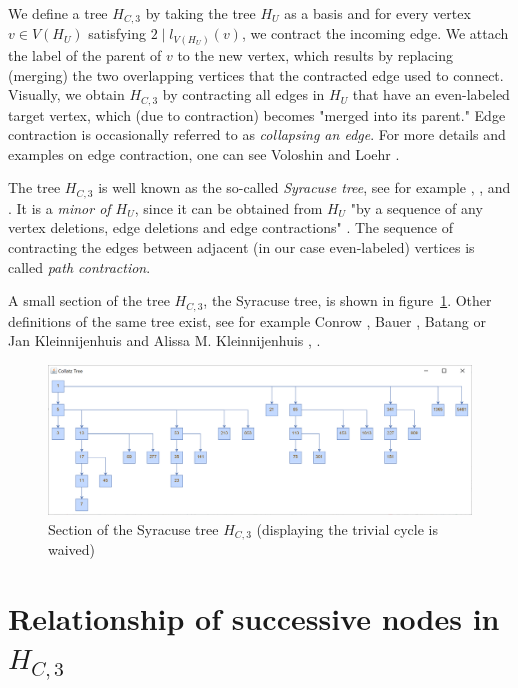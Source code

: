 We define a tree $H_{C,3}$ by taking the tree $H_U$ as a basis and for every vertex $v\in V(H_U)$ satisfying $2\mid l_{V(H_U)}(v)$, we contract the incoming edge. We attach the label of the parent of $v$ to the new vertex, which results by replacing (merging) the two overlapping vertices that the contracted edge used to connect. Visually, we obtain $H_{C,3}$ by contracting all edges in $H_U$ that have an even-labeled target vertex, which (due to contraction) becomes "merged into its parent." Edge contraction is occasionally referred to as \textit{collapsing an edge}. For more details and examples on edge contraction, one can see Voloshin \cite[p.~27]{Ref_Voloshin} and Loehr \cite{Ref_Loehr}.

The tree $H_{C,3}$ is well known as the so-called \textit{Syracuse tree}, see for example \cite{Ref_Kleinnijenhuis_2020a}, \cite{Ref_Aberkane_2017}, and \cite{Ref_Aberkane_2020}. It is a \textit{minor of $H_U$}, since it can be obtained from $H_U$ "by a sequence of any vertex deletions, edge deletions and edge contractions" \cite[p.~32]{Ref_Voloshin}. The sequence of contracting the edges between adjacent (in our case even-labeled) vertices is called \textit{path contraction}.

A small section of the tree $H_{C,3}$, the Syracuse tree, is shown in figure~\ref{fig:2}. Other definitions of the same tree exist, see for example Conrow \cite{Ref_Conrow}, Bauer \cite[p.~379]{Ref_Bauer}, Batang \cite{Ref_Batang} or Jan Kleinnijenhuis and Alissa M. Kleinnijenhuis \cite{Ref_Kleinnijenhuis_2020a}, \cite{Ref_Kleinnijenhuis_2020b}.

\begin{figure}
	\includegraphics[width=1.00\textwidth]{figures/h_c3.png}
	\caption{Section of the Syracuse tree $H_{C,3}$ (displaying the trivial cycle is waived)}
	\label{fig:2}
\end{figure}

\section{\texorpdfstring{Relationship of successive nodes in $H_{C,3}$}{Relationship of successive nodes in HC3}}

